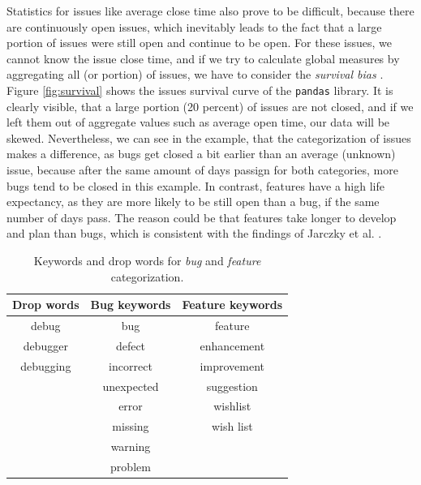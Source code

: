 Statistics for issues like average close time also prove to be difficult, because there are continuously open issues, which inevitably leads to the fact that a large portion of issues were still open and continue to be open. For these issues, we cannot know the issue close time, and if we try to calculate global measures by aggregating all (or portion) of issues, we have to consider the \textit{survival bias} \cite{jarczykSurgicalTeamsGitHub2018}. Figure \ref{fig:survival} shows the issues survival curve of the \texttt{pandas} library. It is clearly visible, that a large portion (20 percent) of issues are not closed, and if we left them out of aggregate values such as average open time, our data will be skewed. Nevertheless, we can see in the example, that the categorization of issues makes a difference, as bugs get closed a bit earlier than an average (unknown) issue, because after the same amount of days passign for both categories, more bugs tend to be closed in this example. In contrast, features have a high life expectancy, as they are more likely to be still open than a bug, if the same number of days pass. The reason could be that features take longer to develop and plan than bugs, which is consistent with the findings of Jarczky et al. \cite{jarczykSurgicalTeamsGitHub2018}.

\begin{table}
    \centering
        \begin{tabular}{| c | c | c |}
            \hline
            \textbf{Drop words} & \textbf{Bug keywords} & \textbf{Feature keywords} \\
            \hline \hline
            debug & bug & feature \\
            debugger & defect & enhancement \\
            debugging & incorrect & improvement \\
             & unexpected & suggestion \\
             & error & wishlist \\
             & missing & wish list \\
             & warning & \\
             & problem & \\
            \hline
        \end{tabular}
    \caption{Keywords and drop words for \textit{bug} and \textit{feature} categorization.}
    \label{tab:keywords}
\end{table}


